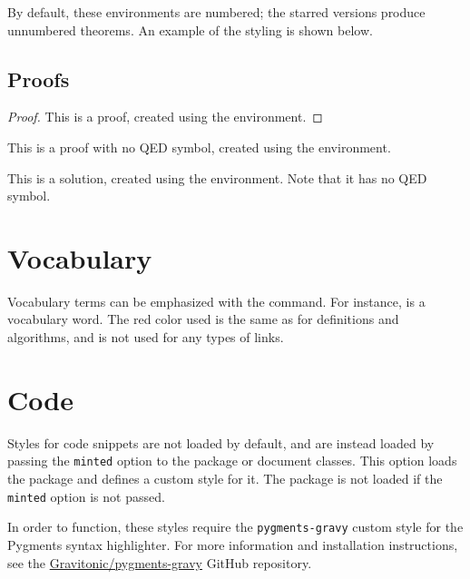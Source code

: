 \documentclass{l3doc}
\begin{document}
By default, these environments are numbered; the starred versions produce unnumbered theorems. An example of the styling is shown below.

\begin{example*}
  \lipsum[1][1-6]
\end{example*}

\subsection{Proofs}

\begin{proof}
  This is a proof, created using the  environment.
\end{proof}

\begin{proof*}
  This is a proof with no QED symbol, created using the  environment.
\end{proof*}

\begin{solution}
  This is a solution, created using the  environment. Note that it has no QED symbol.
\end{solution}

\section{Vocabulary}

\begin{function}{\vocab}
  \begin{syntax}
     
  \end{syntax}

  Vocabulary terms can be emphasized with the  command. For instance,  is a vocabulary word. The red color used is the same as for definitions and algorithms, and is not used for any types of links.
\end{function}

\section{Code}

Styles for code snippets are not loaded by default, and are instead loaded by passing the \texttt{minted} option to the  package or document classes. This option loads the  package and defines a custom style for it. The  package is not loaded if the \texttt{minted} option is not passed.

In order to function, these styles require the \texttt{pygments-gravy} custom style for the Pygments syntax highlighter. For more information and installation instructions, see the \href{https://github.com/Gravitonic/pygments-gravy}{Gravitonic/pygments-gravy} GitHub repository.
\end{document}
